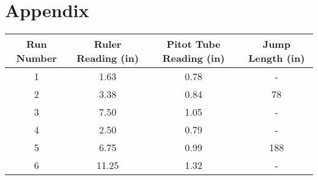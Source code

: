 \documentclass{article}
\begin{document}
\section{Appendix}
\begin{center}
\begin{tabular}{|c|c|c|c|} 
    \hline
    \textbf{Run Number} & \textbf{Ruler Reading (in)} & \textbf{Pitot Tube Reading (in)} & \textbf{Jump Length (in)}  \\ 
    \hline
    1            & 1.63                        & 0.78                             & -                          \\ 
    \hline
    2            & 3.38                        & 0.84                             & 78                         \\ 
    \hline
    3            & 7.50                        & 1.05                             & -                          \\ 
    \hline
    4            & 2.50                        & 0.79                             & -                          \\ 
    \hline
    5            & 6.75                        & 0.99                             & 188                        \\ 
    \hline
    6            & 11.25                       & 1.32                             & -                          \\
    \hline
\end{tabular}
\end{center}
\end{document}
